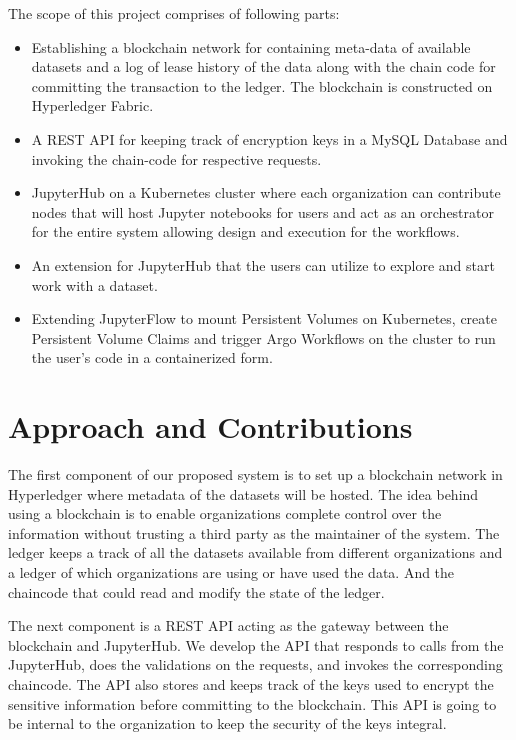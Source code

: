 \bigskip
The scope of this project comprises of following parts:
\begin{itemize}
    \item Establishing a blockchain network for containing meta-data of available datasets and a log of lease history of the data along with the chain code for committing the transaction to the ledger. The blockchain is constructed on Hyperledger Fabric.
    \item A REST API for keeping track of encryption keys in a MySQL Database and invoking the chain-code for respective requests.
    \item JupyterHub on a Kubernetes cluster where each organization can contribute nodes that will host Jupyter notebooks for users and act as an orchestrator for the entire system allowing design and execution for the workflows.
    \item An extension for JupyterHub that the users can utilize to explore and start work with a dataset.
    \item Extending JupyterFlow to mount Persistent Volumes on Kubernetes, create Persistent Volume Claims and trigger Argo Workflows on the cluster to run the user's code in a containerized form.
\end{itemize}

\section{Approach and Contributions}
The first component of our proposed system is to set up a blockchain network in Hyperledger where metadata of the datasets will be hosted. The idea behind using a blockchain is to enable organizations complete control over the information without trusting a third party as the maintainer of the system. The ledger keeps a track of all the datasets available from different organizations and a ledger of which organizations are using or have used the data. And the chaincode that could read and modify the state of the ledger. 

\bigskip
The next component is a REST API acting as the gateway between the blockchain and JupyterHub. We develop the API that responds to calls from the JupyterHub, does the validations on the requests, and invokes the corresponding chaincode. The API also stores and keeps track of the keys used to encrypt the sensitive information before committing to the blockchain. This API is going to be internal to the organization to keep the security of the keys integral.

